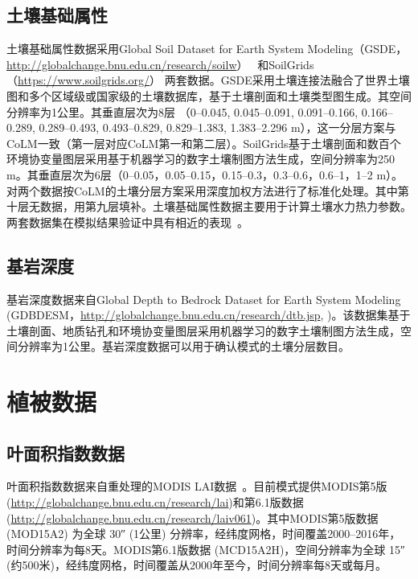 \subsection{土壤基础属性}\label{土壤基础属性}
土壤基础属性数据采用Global Soil Dataset for Earth System Modeling（GSDE，\url{http://globalchange.bnu.edu.cn/research/soilw}）~\citep{shangguan2014global}
和SoilGrids（\url{https://www.soilgrids.org/}）\citep{poggio2021soilgrids} 两套数据。GSDE采用土壤连接法融合了世界土壤图和多个区域级或国家级的土壤数据库，基于土壤剖面和土壤类型图生成。其空间分辨率为1公里。其垂直层次为8层 （0--0.045, 0.045--0.091, 0.091--0.166, 0.166--0.289, 0.289--0.493, 0.493--0.829, 0.829--1.383, 1.383--2.296 m），这一分层方案与CoLM一致（第一层对应CoLM第一和第二层）。SoilGrids基于土壤剖面和数百个环境协变量图层采用基于机器学习的数字土壤制图方法生成，空间分辨率为250 m。其垂直层次为6层（0--0.05，0.05--0.15，0.15--0.3，0.3--0.6，0.6--1，1--2 m）。对两个数据按CoLM的土壤分层方案采用深度加权方法进行了标准化处理。其中第十层无数据，用第九层填补。土壤基础属性数据主要用于计算土壤水力热力参数。两套数据集在模拟结果验证中具有相近的表现~\citep{李文耀2020土壤}。

\subsection{基岩深度}\label{基岩深度}

基岩深度数据来自Global Depth to Bedrock Dataset for Earth System Modeling (GDBDESM，\url{http://globalchange.bnu.edu.cn/research/dtb.jsp}, \citet{shangguan2017mapping})。该数据集基于土壤剖面、地质钻孔和环境协变量图层采用机器学习的数字土壤制图方法生成，空间分辨率为1公里。基岩深度数据可以用于确认模式的土壤分层数目。




\section{植被数据}\label{植被数据}
\subsection{叶面积指数数据}\label{叶面积指数数据}
叶面积指数数据来自重处理的MODIS LAI数据~\citep{yuan2011reprocessing,lin2023ReprocessedMODISVersion}。目前模式提供MODIS第5版(\url{http://globalchange.bnu.edu.cn/research/lai})和第6.1版数据(\url{http://globalchange.bnu.edu.cn/research/laiv061})。其中MODIS第5版数据 (MOD15A2) 为全球 \ang{;;30} (1公里) 分辨率，经纬度网格，时间覆盖2000--2016年，时间分辨率为每8天。MODIS第6.1版数据 (MCD15A2H)，空间分辨率为全球 \ang{;;15} (约500米)，经纬度网格，时间覆盖从2000年至今，时间分辨率每8天或每月。


